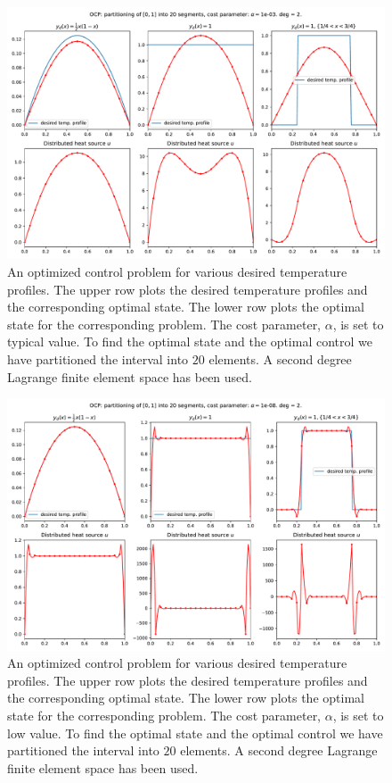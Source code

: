 \begin{figure}
  \centering
  \includegraphics[width=\textwidth]{Images/plots/task2_fig_1.pdf}
  \caption{An optimized control problem for various
    desired temperature profiles. The upper row plots the
    desired temperature profiles and the corresponding 
    optimal state. The lower row plots the
    optimal state for the corresponding problem.
    The cost parameter, $\alpha$, is set to typical value.
    To find the optimal state and the optimal control we 
    have partitioned the interval into \( 20 \) elements.
    A second degree Lagrange finite element space has been used.}
  \label{fig:1}
\end{figure}

\begin{figure}
  \centering
  \includegraphics[width=\textwidth]{Images/plots/task2_fig_2.pdf}
  \caption{An optimized control problem for various
    desired temperature profiles. The upper row plots the
    desired temperature profiles and the corresponding 
    optimal state. The lower row plots the
    optimal state for the corresponding problem.
    The cost parameter, $\alpha$, is set to low value.
    To find the optimal state and the optimal control we 
    have partitioned the interval into \( 20 \) elements.
    A second degree Lagrange finite element space has been used.}
  \label{fig:2}
\end{figure}


